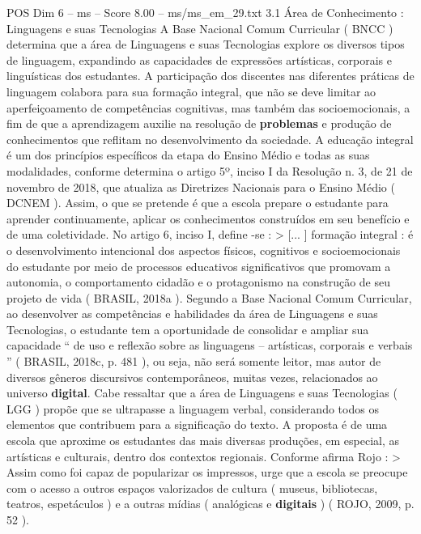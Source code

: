 \begin{textsample}{POS Dim 6 – ms – Score 8.00 – ms/ms\_em\_29.txt}  \label{ex:f6_pos_059}
3.1 Área de Conhecimento : Linguagens e suas Tecnologias A Base Nacional Comum Curricular ( BNCC ) determina que a área de Linguagens e suas Tecnologias explore os diversos tipos de linguagem, expandindo as capacidades de expressões artísticas, corporais e linguísticas dos estudantes.
A participação dos discentes nas diferentes práticas de linguagem colabora para sua formação integral, que não se deve limitar ao aperfeiçoamento de competências cognitivas, mas também das socioemocionais, a fim de que a aprendizagem auxilie na resolução de \textbf{problemas} e produção de conhecimentos que reflitam no desenvolvimento da sociedade.
A educação integral é um dos princípios específicos da etapa do Ensino Médio e todas as suas modalidades, conforme determina o artigo 5º, inciso I da Resolução n. 3, de 21 de novembro de 2018, que atualiza as Diretrizes Nacionais para o Ensino Médio ( DCNEM ).
Assim, o que se pretende é que a escola prepare o estudante para aprender continuamente, aplicar os conhecimentos construídos em seu benefício e de uma coletividade.
No artigo 6, inciso I, define -se : > [... ] formação integral : é o desenvolvimento intencional dos aspectos físicos, cognitivos e socioemocionais do estudante por meio de processos educativos significativos que promovam a autonomia, o comportamento cidadão e o protagonismo na construção de seu projeto de vida ( BRASIL, 2018a ).
Segundo a Base Nacional Comum Curricular, ao desenvolver as competências e habilidades da área de Linguagens e suas Tecnologias, o estudante tem a oportunidade de consolidar e ampliar sua capacidade “ de uso e reflexão sobre as linguagens – artísticas, corporais e verbais ” ( BRASIL, 2018c, p. 481 ), ou seja, não será somente leitor, mas autor de diversos gêneros discursivos contemporâneos, muitas vezes, relacionados ao universo \textbf{digital}.
Cabe ressaltar que a área de Linguagens e suas Tecnologias ( LGG ) propõe que se ultrapasse a linguagem verbal, considerando todos os elementos que contribuem para a significação do texto.
A proposta é de uma escola que aproxime os estudantes das mais diversas produções, em especial, as artísticas e culturais, dentro dos contextos regionais.
Conforme afirma Rojo : > Assim como foi capaz de popularizar os impressos, urge que a escola se preocupe com o acesso a outros espaços valorizados de cultura ( museus, bibliotecas, teatros, espetáculos ) e a outras mídias ( analógicas e \textbf{digitais} ) ( ROJO, 2009, p. 52 ).

\end{textsample}
